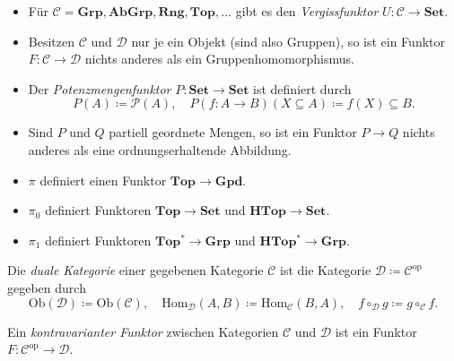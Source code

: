 \documentclass{cheat-sheet}
\newcommand{\Ob}{\mathrm{Ob}} %
\newcommand{\Hom}{\mathrm{Hom}} %
\newcommand{\op}{\text{op}} %
\begin{document}
\begin{bspe}
  \begin{itemize}
    \item Für $\mathcal{C} = \mathbf{Grp}, \mathbf{AbGrp}, \mathbf{Rng}, \mathbf{Top}, ...$ gibt es den \emph{Vergissfunktor} $U : \mathcal{C} \to \mathbf{Set}$.
    \item Besitzen $\mathcal{C}$ und $\mathcal{D}$ nur je ein Objekt (sind also Gruppen), so ist ein Funktor $F : \mathcal{C} \to \mathcal{D}$ nichts anderes als ein Gruppenhomomorphismus.
    \item Der \emph{Potenzmengenfunktor} $P : \mathbf{Set} \to \mathbf{Set}$ ist definiert durch
    \[ P(A) \coloneqq \mathcal{P}(A), \quad P(f : A \to B)(X \subseteq A) \coloneqq f(X) \subseteq B. \]
    \item Sind $P$ und $Q$ partiell geordnete Mengen, so ist ein Funktor $P \to Q$ nichts anderes als eine ordnungserhaltende Abbildung.
  \end{itemize}
\end{bspe}

\begin{bem}
  \begin{itemize}
    \item $\pi$ definiert einen Funktor $\mathbf{Top} \to \mathbf{Gpd}$.
    \item $\pi_0$ definiert Funktoren $\mathbf{Top} \to \mathbf{Set}$ und $\mathbf{HTop} \to \mathbf{Set}$.
    \item $\pi_1$ definiert Funktoren $\mathbf{Top^*} \to \mathbf{Grp}$ und $\mathbf{HTop^*} \to \mathbf{Grp}$.
  \end{itemize}
\end{bem}

\begin{defn}
  Die \emph{duale Kategorie} einer gegebenen Kategorie $\mathcal{C}$ ist die Kategorie $\mathcal{D} \coloneqq \mathcal{C}^\op$ gegeben durch
  \[
    \Ob(\mathcal{D}) \coloneqq \Ob(\mathcal{C}), \quad
    \Hom_{\mathcal{D}}(A, B) \coloneqq \Hom_{\mathcal{C}}(B, A), \quad
    f \circ_{\mathcal{D}} g \coloneqq g \circ_{\mathcal{C}} f.
  \]
\end{defn}

\begin{defn}
  Ein \emph{kontravarianter Funktor} zwischen Kategorien $\mathcal{C}$ und $\mathcal{D}$ ist ein Funktor $F : \mathcal{C}^\op \to \mathcal{D}$.
\end{defn}
\end{document}
